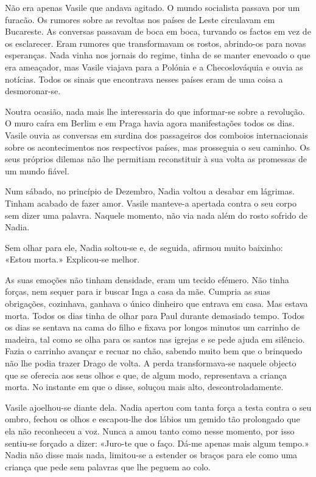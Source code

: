 Não era apenas Vasile que andava agitado. O mundo socialista passava por
um furacão. Os rumores sobre as revoltas nos países de Leste circulavam
em Bucareste. As conversas passavam de boca em boca, turvando os factos
em vez de os esclarecer. Eram rumores que transformavam os rostos,
abrindo-os para novas esperanças. Nada vinha nos jornais do regime,
tinha de se manter enevoado o que era ameaçador, mas Vasile viajava para
a Polónia e a Checoslováquia e ouvia as notícias. Todos os sinais que
encontrava nesses países eram de uma coisa a desmoronar-se.

Noutra ocasião, nada mais lhe interessaria do que informar-se sobre a
revolução. O muro caíra em Berlim e em Praga havia agora manifestações
todos os dias. Vasile ouvia as conversas em surdina dos passageiros dos
comboios internacionais sobre os acontecimentos nos respectivos
países, mas prosseguia o seu caminho. Os seus próprios dilemas não lhe
permitiam reconstituir à sua volta as promessas de um mundo fiável.

Num sábado, no princípio de Dezembro, Nadia voltou a desabar em
lágrimas. Tinham acabado de fazer amor. Vasile manteve-a apertada contra
o seu corpo sem dizer uma palavra. Naquele momento, não via nada além do
rosto sofrido de Nadia.

Sem olhar para ele, Nadia soltou-se e, de seguida, afirmou muito
baixinho: «Estou morta.» Explicou-se melhor.

As suas emoções não tinham densidade, eram um tecido efémero. Não tinha
forças, nem sequer para ir buscar Inga a casa da mãe. Cumpria as suas
obrigações, cozinhava, ganhava o único dinheiro que entrava em casa. Mas
estava morta. Todos os dias tinha de olhar para Paul durante demasiado
tempo. Todos os dias se sentava na cama do filho e fixava por longos
minutos um carrinho de madeira, tal como se olha para os santos nas
igrejas e se pede ajuda em silêncio. Fazia o carrinho avançar e recuar
no chão, sabendo muito bem que o brinquedo não lhe podia trazer Drago de
volta. A perda transformava-se naquele objecto que se oferecia aos seus
olhos e que, de algum modo, representava a criança morta. No instante em
que o disse, soluçou mais alto, descontroladamente.

Vasile ajoelhou-se diante dela. Nadia apertou com tanta
força a testa contra o seu ombro, fechou os olhos e escapou-lhe dos
lábios um gemido tão prolongado que ela não reconheceu a voz. Nunca a
amou tanto como nesse momento, por isso sentiu-se forçado a dizer:
«Juro-te que o faço. Dá-me apenas mais algum tempo.» Nadia não disse
mais nada, limitou-se a estender os braços para ele como uma criança que
pede sem palavras que lhe peguem ao colo.


